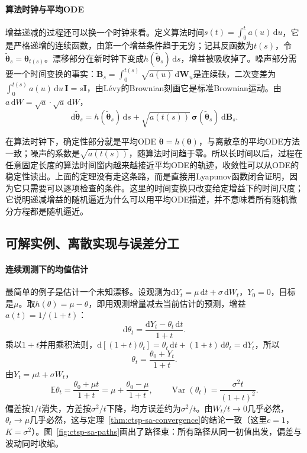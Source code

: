 \paragraph{算法时钟与平均ODE}
增益递减的过程还可以换一个时钟来看。定义算法时间$s(t)=\int_0^ta(u)\,\mathrm du$，它是严格递增的连续函数，由第一个增益条件趋于无穷；记其反函数为$t(s)$，令$\widetilde{\bm\theta}_s=\bm\theta_{t(s)}$。漂移部分在新时钟下变成$h(\widetilde{\bm\theta}_s)\,\mathrm ds$，增益被吸收掉了。噪声部分需要一个时间变换的事实：$\bm B_s=\int_0^{t(s)}\sqrt{a(u)}\,\mathrm d\bm W_u$是连续鞅，二次变差为$\int_0^{t(s)}a(u)\,\mathrm du\,\bm I=s\bm I$，由Lévy的Brownian刻画它是标准Brownian运动。由$a\,\mathrm dW=\sqrt a\cdot\sqrt a\,\mathrm dW$，
\begin{equation}
  \mathrm d\widetilde{\bm\theta}_s=h(\widetilde{\bm\theta}_s)\,\mathrm ds+\sqrt{a(t(s))}\,\bm\sigma(\widetilde{\bm\theta}_s)\,\mathrm d\bm B_s .
  \label{eq:ctsp-algorithm-clock}
\end{equation}

在算法时钟下，确定性部分就是平均ODE $\dot{\bm\theta}=h(\bm\theta)$，与离散章的平均ODE方法一致；噪声的系数是$\sqrt{a(t(s))}$，随算法时间趋于零。所以长时间以后，过程在任意固定长度的算法时间窗内越来越接近平均ODE的轨迹，收敛性可以从ODE的稳定性读出。上面的定理没有走这条路，而是直接用Lyapunov函数闭合证明，因为它只需要可以逐项检查的条件。这里的时间变换只改变给定增益下的时间尺度；它说明递减增益的随机逼近为什么可以用平均ODE描述，并不意味着所有随机微分方程都是随机逼近。

\subsection{可解实例、离散实现与误差分工}
\label{sec:ctsp-sa-example}

\paragraph{连续观测下的均值估计}
最简单的例子是估计一个未知漂移。设观测为$\mathrm dY_t=\mu\,\mathrm dt+\sigma\,\mathrm dW_t$，$Y_0=0$，目标是$\mu$。取$h(\theta)=\mu-\theta$，即用观测增量减去当前估计的预测，增益$a(t)=1/(1+t)$：
\[
  \mathrm d\theta_t=\frac{\mathrm dY_t-\theta_t\,\mathrm dt}{1+t} .
\]
乘以$1+t$并用乘积法则，$\mathrm d[(1+t)\theta_t]=\theta_t\,\mathrm dt+(1+t)\,\mathrm d\theta_t=\mathrm dY_t$，所以
\begin{equation}
  \theta_t=\frac{\theta_0+Y_t}{1+t} .
  \label{eq:ctsp-sa-solution}
\end{equation}
由$Y_t=\mu t+\sigma W_t$，
\[
  \mathbb E\theta_t=\frac{\theta_0+\mu t}{1+t}=\mu+\frac{\theta_0-\mu}{1+t},\qquad
  \operatorname{Var}(\theta_t)=\frac{\sigma^2t}{(1+t)^2}.
\]
偏差按$1/t$消失，方差按$\sigma^2/t$下降，均方误差约为$\sigma^2/t$。由$W_t/t\to0$几乎必然，$\theta_t\to\mu$几乎必然，这与定理~\ref{thm:ctsp-sa-convergence}的结论一致（这里$c=1$，$K=\sigma^2$）。图~\ref{fig:ctsp-sa-paths}画出了路径束：所有路径从同一初值出发，偏差与波动同时收缩。

